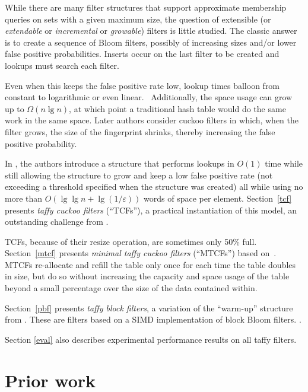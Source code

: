 \documentclass[manuscript,screen,review]{acmart}
\begin{document}
While there are many filter structures that support approximate membership queries on sets with a given maximum size, the question of extensible (or {\itshape extendable} or {\itshape incremental} or {\itshape growable}) filters is little studied.
The classic answer is to create a sequence of Bloom filters, possibly of increasing sizes and/or lower false positive probabilities.
Inserts occur on the last filter to be created and lookups must search each filter.

Even when this keeps the false positive rate low, lookup times balloon from constant to logarithmic or even linear.~\cite{psw,logarithm,consistent-cuckoo} %
Additionally, the space usage can grow up to $\Omega(n \lg n)$, at which point a traditional hash table would do the same work in the same space.
Later authors consider cuckoo filters in which, when the filter grows, the size of the fingerprint shrinks, thereby increasing the false positive probability.~\cite{logarithm,morton-journal,vacuum,rsqf}

In \cite{psw}, the authors introduce a structure that performs lookups in $O(1)$ time while still allowing the structure to grow and keep a low false positive rate (not exceeding a threshold specified when the structure was created) all while using no more than $O(\lg \lg n + \lg (1/\varepsilon))$ words of space per element.
Section~\ref{tcf} presents {\em taffy cuckoo filters} (``TCFs''), a practical instantiation of this model, an outstanding challenge from \cite{psw}.

TCFs, because of their resize operation, are sometimes only 50\% full.
Section~\ref{mtcf} presents {\em minimal taffy cuckoo filters} (``MTCFs'') based on~\cite{dysect}.
MTCFs re-allocate and refill the table only once for each time the table doubles in size, but do so without increasing the capacity and space usage of the table beyond a small percentage over the size of the data contained within.

Section~\ref{pbf} presents {\em taffy block filters}, a variation of the ``warm-up'' structure from \cite{psw}.
These are filters based on a SIMD implementation of block Bloom filters. \cite{block-bloom}.

Section \ref{eval} also describes experimental performance results on all taffy filters.


\section{Prior work}
\end{document}
